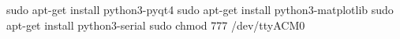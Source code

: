 sudo apt-get install python3-pyqt4
sudo apt-get install python3-matplotlib
sudo apt-get install python3-serial
sudo chmod 777 /dev/ttyACM0